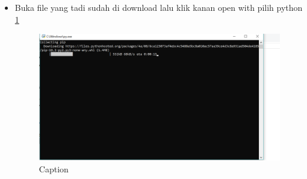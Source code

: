 \begin{enumerate}
\begin{itemize}
        \item Buka file yang tadi sudah di download lalu klik kanan open with pilih python \ref{pip2}
        \begin{figure} [h]
            \centering
            \includegraphics[scale=0.3]{figures/Screenshot (25).png}
            \caption{Caption}
            \label{pip2}
        \end{figure}
        

\end{itemize}
\end{enumerate}
